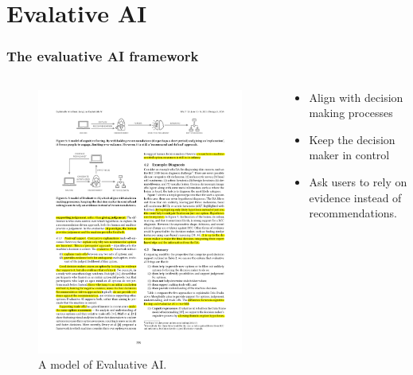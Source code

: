 \documentclass[compress,12pt]{beamer}
\begin{document}
\section{Evalative AI}
\begin{frame}
      \frametitle{The evaluative AI framework}
      \begin{columns}[T] %
            \begin{column}{.5\textwidth}
                  \begin{figure}[htbp]
                        \centering
                        \includegraphics[width=\textwidth]{fig6.pdf}
                        \caption{A model of Evaluative AI.}
                  \end{figure}
            \end{column}%
            \hfill%
            \begin{column}{.5\textwidth}
                  \begin{itemize}
                        \item Align with decision making processes
                        \item Keep the decision maker in control
                        \item Ask users to rely on evidence instead of recommendations.
                  \end{itemize}
            \end{column}%
      \end{columns}
\end{frame}
\end{document}
